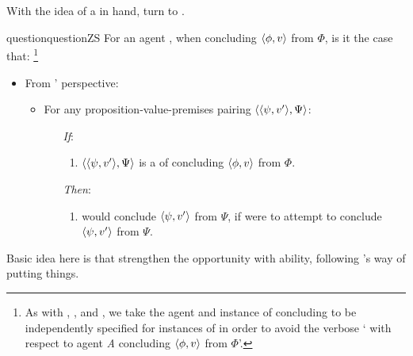 \section{\zS{}}
\label{cha:zS:sec:question}

\begin{note}
  With the idea of a \requ{} in hand, turn to \zSN{}.
\end{note}

\begin{note}
  \begin{restatable}[\qzS{}]{question}{questionZS}
    \label{question:zs}
    For an agent \vAgent{}, when concluding \(\langle \phi, v \rangle\) from \(\Phi\), is it the case that:%
    \footnote{
      As with \qWhy{}, \qHow{}, and \qWhyV{}, we take the agent and instance of concluding to be independently specified for instances of \qzS{} in order to avoid the verbose `\qzS{} with respect to agent \emph{A} concluding \(\langle \phi, v \rangle\) from \(\Phi\)'.
    }

    \begin{itemize}
    \item
      From \vAgent{}' perspective:
      \begin{itemize}
      \item
        For any proposition-value-premises pairing \(\langle \langle \psi, v' \rangle, \Psi \rangle\):
        \begin{itemize}
        \item[\emph{If}:]
          \begin{enumerate}[label=\alph*., ref=(\alph*)]
          \item
            \label{question:zs:option}
            \(\langle \langle \psi, v' \rangle, \Psi \rangle\) is a \requ{} of concluding \(\langle \phi, v \rangle\) from \(\Phi\).
          \end{enumerate}
        \item[\emph{Then}:]
          \begin{enumerate}[label=\alph*., ref=(\alph*), resume]
          \item
            \label{question:zs:may-fail}
            \vAgent{} would conclude \(\langle \psi, v' \rangle\) from \(\Psi\), if \vAgent{} were to attempt to conclude \(\langle \psi, v' \rangle\) from \(\Psi\).
          \end{enumerate}
        \end{itemize}
      \end{itemize}
    \end{itemize}
    \vspace{-\baselineskip}
  \end{restatable}

  Basic idea here is that strengthen the opportunity with ability, following \citeauthor{Austin:1961vz}'s way of putting things.
\end{note}

